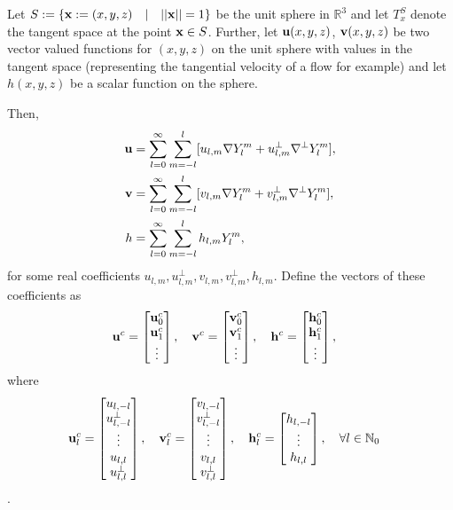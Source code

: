 \documentclass[11pt, oneside]{article}   	%
\newcommand{\R}{\mathbb{R}}
\newcommand{\No}{\mathbb{N}_0}
\newcommand{\Ylm}{Y^m_l}
\newcommand{\gradYlm}{\nabla Y^m_l}
\newcommand{\gradpYlm}{\nabla^\perp Y^m_l}
\begin{document}
Let \(S := \{ \bold{x} := (x,y,z) \quad | \quad ||\bold{x}|| = 1\}\) be the unit sphere in \(\R^3\) and let \(T_x^S\) denote the tangent space at the point \(\bold{x} \in S\). Further, let \(\bold{u}(x,y,z)\), \(\bold{v}(x,y,z)\) be two vector valued functions for \((x,y,z)\) on the unit sphere with values in the tangent space (representing the tangential velocity of a flow for example) and let \(h(x,y,z)\) be a scalar function on the sphere.

Then, 
\begin{align}
\bold{u} &= \sum_{l=0}^{\infty} \sum_{m=-l}^{l} [ u_{l,m} \gradYlm + u^{\perp}_{l,m} \gradpYlm ], \\
\bold{v} &= \sum_{l=0}^{\infty} \sum_{m=-l}^{l} [ v_{l,m} \gradYlm + v^{\perp}_{l,m} \gradpYlm ], \\
h &= \sum_{l=0}^{\infty} \sum_{m=-l}^{l} h_{l,m} \Ylm,
\end{align}
for some real coefficients \(u_{l,m}, u^{\perp}_{l,m}, v_{l,m}, v^{\perp}_{l,m}, h_{l,m}\). Define the vectors of these coefficients as 
\begin{align}
\bold{u}^c &= \begin{bmatrix}
			\bold{u}_0^c \\
			\bold{u}_1^c \\
			\vdots \\
		    \end{bmatrix},
\quad
\bold{v}^c = \begin{bmatrix}
			\bold{v}_0^c \\
			\bold{v}_1^c \\
			\vdots \\
		    \end{bmatrix},
\quad
\bold{h}^c = \begin{bmatrix}
			\bold{h}_0^c \\
			\bold{h}_1^c \\
			\vdots \\
		    \end{bmatrix},		  
\end{align}
where
\begin{align}
\bold{u}^c_l &= \begin{bmatrix}
				u_{l,-l} \\
				u^{\perp}_{l,-l} \\
				\vdots \\
				u_{l,l} \\
				u^{\perp}_{l,l}
		        \end{bmatrix},
\quad
\bold{v}^c_l = \begin{bmatrix}
				v_{l,-l} \\
				v^{\perp}_{l,-l} \\
				\vdots \\
				v_{l,l} \\
				v^{\perp}_{l,l}
		        \end{bmatrix},
\quad
\bold{h}^c_l = \begin{bmatrix}
				h_{l,-l} \\
				\vdots \\
				h_{l,l} \\
		        \end{bmatrix},
\quad \forall l \in \No	  
\end{align}.
\end{document}
